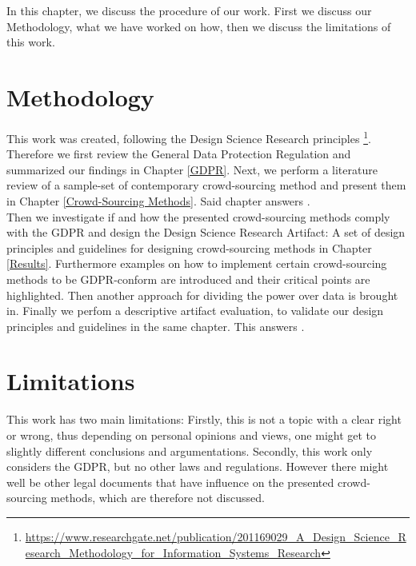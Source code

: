 \documentclass[a4paper,12pt]{report}
\begin{document}
	In this chapter, we discuss the procedure of our work.
	First we discuss our Methodology, what we have worked on how, then we discuss the limitations of this work.
	\section{Methodology}
	\startsection
		This work was created, following the Design Science Research principles \footnote{\url{https://www.researchgate.net/publication/201169029_A_Design_Science_Research_Methodology_for_Information_Systems_Research}}.
		Therefore we first review the General Data Protection Regulation and summarized our findings in Chapter \ref{GDPR}.
		Next, we perform a literature review of a sample-set of contemporary crowd-sourcing method and present them in Chapter \ref{Crowd-Sourcing Methods}.
		Said chapter answers . \\
		Then we investigate if and how the presented crowd-sourcing methods comply with the GDPR and design the Design Science Research Artifact: A set of design principles and guidelines for designing crowd-sourcing methods in Chapter \ref{Results}. 
		Furthermore examples on how to implement certain crowd-sourcing methods to be GDPR-conform are introduced and their critical points are highlighted. 
		Then another approach for dividing the power over data is brought in.
		Finally we perfom a descriptive artifact evaluation, to validate our design principles and guidelines in the same chapter.
		This answers .
	\closesection
	
	\section{Limitations}
	\startsection
		This work has two main limitations:
		Firstly, this is not a topic with a clear right or wrong, thus depending on personal opinions and views, one might get to slightly different conclusions and argumentations.
		Secondly, this work only considers the GDPR, but no other laws and regulations.
		However there might well be other legal documents that have influence on the presented crowd-sourcing methods, which are therefore not discussed.
	\closesection
\end{document}
